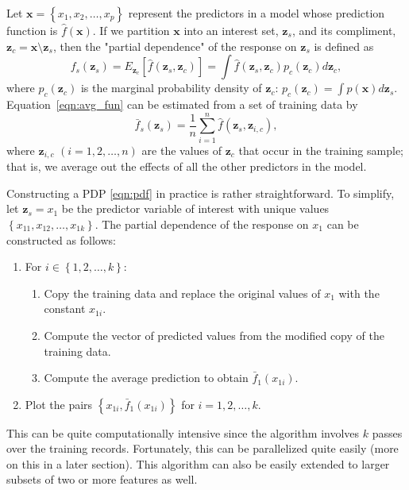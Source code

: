 Let $\boldsymbol{x} = \left\{x_1, x_2, \dots, x_p\right\}$ represent the predictors in a model whose prediction function is $\widehat{f}\left(\boldsymbol{x}\right)$. If we partition $\boldsymbol{x}$ into an interest set, $\boldsymbol{z}_s$, and its compliment, $\boldsymbol{z}_c = \boldsymbol{x} \setminus \boldsymbol{z}_s$, then the "partial dependence" of the response on $\boldsymbol{z}_s$ is defined as
\begin{equation}
\label{eqn:avg_fun}
  f_s\left(\boldsymbol{z}_s\right) = E_{\boldsymbol{z}_c}\left[\widehat{f}\left(\boldsymbol{z}_s, \boldsymbol{z}_c\right)\right] = \int \widehat{f}\left(\boldsymbol{z}_s, \boldsymbol{z}_c\right)p_{c}\left(\boldsymbol{z}_c\right)d\boldsymbol{z}_c,
\end{equation}
where $p_{c}\left(\boldsymbol{z}_c\right)$ is the marginal probability density of $\boldsymbol{z}_c$: $p_{c}\left(\boldsymbol{z}_c\right) = \int p\left(\boldsymbol{x}\right)d\boldsymbol{z}_s$.
Equation~\eqref{eqn:avg_fun} can be estimated from a set of training data by
\begin{equation}
\label{eqn:pdf}
\bar{f}_s\left(\boldsymbol{z}_s\right) = \frac{1}{n}\sum_{i = 1}^n\widehat{f}\left(\boldsymbol{z}_s,\boldsymbol{z}_{i, c}\right),
\end{equation}
where $\boldsymbol{z}_{i, c}$ $\left(i = 1, 2, \dots, n\right)$ are the values of $\boldsymbol{z}_c$ that occur in the training sample; that is, we average out the effects of all the other predictors in the model.

Constructing a PDP \eqref{eqn:pdf} in practice is rather straightforward. To simplify, let $\boldsymbol{z}_s = x_1$ be the predictor variable of interest with unique values $\left\{x_{11}, x_{12}, \dots, x_{1k}\right\}$. The partial dependence of the response on $x_1$ can be constructed as follows:
\begin{enumerate}
  \item For $i \in \left\{1, 2, \dots, k\right\}$:
  \begin{enumerate}
    \item Copy the training data and replace the original values of $x_1$ with the constant $x_{1i}$.
    \item Compute the vector of predicted values from the modified copy of the training data.
    \item Compute the average prediction to obtain $\bar{f}_1\left(x_{1i}\right)$.
  \end{enumerate}
  \item Plot the pairs $\left\{x_{1i}, \bar{f}_1\left(x_{1i}\right)\right\}$ for $i = 1, 2, \dotsc, k$.
\end{enumerate}
This can be quite computationally intensive since the algorithm involves $k$ passes over the training records. Fortunately, this can be parallelized quite easily (more on this in a later section). This algorithm can also be easily extended to larger subsets of two or more features as well.

